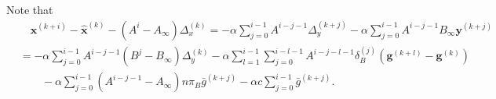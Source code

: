 \documentclass[10pt]{article}
\newcommand{\vg}{{\mathbf{g}}}
\newcommand{\vx}{{\mathbf{x}}}
\newcommand{\vy}{{\mathbf{y}}}
\begin{document}
Note that
\begin{align*}
    &\quad\vx^{(k+i)}- \hat{\vx}^{(k)}- (A^i-A_\infty)\Delta_x^{(k)}=-\alpha \sum_{j=0}^{i-1}A^{i-j-1}\Delta_y^{(k+j)}-\alpha \sum_{j=0}^{i-1}A^{i-j-1}B_\infty\vy^{(k+j)}\\
    &=-\alpha \sum_{j=0}^{i-1}A^{i-j-1}(B^j-B_\infty) \Delta_y^{(k)} - \alpha \sum_{l=1}^{i-1}\sum_{j=0}^{i-l-1}A^{i-j-l-1}\delta_B^{(j)}(\vg^{(k+l)}-\vg^{(k)}) \\
    &\quad\quad-\alpha \sum_{j=0}^{i-1}(A^{i-j-1}-A_\infty)n\pi_B\bar{g}^{(k+j)}-\alpha c\sum_{j=0}^{i-1}\bar{g}^{(k+j)}.
\end{align*}

\end{document}
